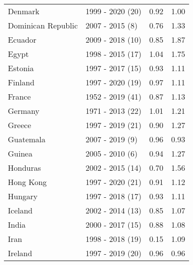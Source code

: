 \begin{table}[H]
{{\begin{tabular}{llrr}
\addlinespace
Denmark & 1999 - 2020 (20) & 0.92 & 1.00\\
Dominican Republic & 2007 - 2015 (8) & 0.76 & 1.33\\
Ecuador & 2009 - 2018 (10) & 0.85 & 1.87\\
Egypt & 1998 - 2015 (17) & 1.04 & 1.75\\
Estonia & 1997 - 2017 (15) & 0.93 & 1.11\\
\addlinespace
Finland & 1997 - 2020 (19) & 0.97 & 1.11\\
France & 1952 - 2019 (41) & 0.87 & 1.13\\
Germany & 1971 - 2013 (22) & 1.01 & 1.21\\
Greece & 1997 - 2019 (21) & 0.90 & 1.27\\
Guatemala & 2007 - 2019 (9) & 0.96 & 0.93\\
\addlinespace
Guinea & 2005 - 2010 (6) & 0.94 & 1.27\\
Honduras & 2002 - 2015 (14) & 0.70 & 1.56\\
Hong Kong & 1997 - 2020 (21) & 0.91 & 1.12\\
Hungary & 1997 - 2018 (17) & 0.93 & 1.11\\
Iceland & 2002 - 2014 (13) & 0.85 & 1.07\\
\addlinespace
India & 2000 - 2017 (15) & 0.88 & 1.08\\
Iran & 1998 - 2018 (19) & 0.15 & 1.09\\
Ireland & 1997 - 2019 (20) & 0.96 & 0.96\\
\bottomrule
\end{tabular}
}

}
\end{table}
